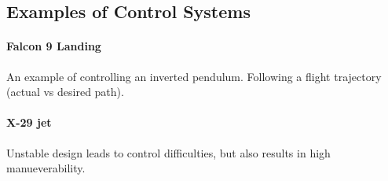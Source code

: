 \documentclass[../notes.tex]{subfiles}
\begin{document}
\subsection{Examples of Control Systems}
\paragraph{Falcon 9 Landing}
An example of controlling an inverted pendulum. Following a flight trajectory (actual vs desired path).
\paragraph{X-29 jet}
Unstable design leads to control difficulties, but also results in high manueverability.
\end{document}
